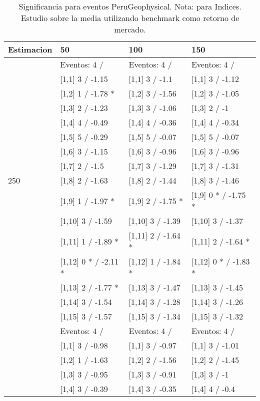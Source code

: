 \begin{table}

\caption{Significancia para eventos PeruGeophysical. Nota: para Indices. Estudio sobre la media utilizando benchmark como retorno de mercado.}
\centering
\begin{tabular}[t]{llll}
\toprule
Estimacion & 50 & 100 & 150\\
\midrule
 & Eventos:  4 / & Eventos:  4 / & Eventos:  4 /\\
 & {}[1,1] 3  / -1.15 & {}[1,1] 3  / -1.1 & {}[1,1] 3  / -1.12\\
 & {}[1,2] 1  / -1.78 * & {}[1,2] 3  / -1.56 & {}[1,2] 3  / -1.05\\
 & {}[1,3] 2  / -1.23 & {}[1,3] 3  / -1.06 & {}[1,3] 2  / -1\\
 & {}[1,4] 4  / -0.49 & {}[1,4] 4  / -0.36 & {}[1,4] 4  / -0.34\\
\addlinespace
 & {}[1,5] 5  / -0.29 & {}[1,5] 5  / -0.07 & {}[1,5] 5  / -0.07\\
 & {}[1,6] 3  / -1.15 & {}[1,6] 3  / -0.96 & {}[1,6] 3  / -0.96\\
 & {}[1,7] 2  / -1.5 & {}[1,7] 3  / -1.29 & {}[1,7] 3  / -1.31\\
250 & {}[1,8] 2  / -1.63 & {}[1,8] 2  / -1.44 & {}[1,8] 3  / -1.46\\
 & {}[1,9] 1  / -1.97 * & {}[1,9] 2  / -1.75 * & {}[1,9] 0 * / -1.75 *\\
\addlinespace
 & {}[1,10] 3  / -1.59 & {}[1,10] 3  / -1.39 & {}[1,10] 3  / -1.37\\
 & {}[1,11] 1  / -1.89 * & {}[1,11] 2  / -1.64 * & {}[1,11] 2  / -1.64 *\\
 & {}[1,12] 0 * / -2.11 * & {}[1,12] 1  / -1.84 * & {}[1,12] 0 * / -1.83 *\\
 & {}[1,13] 2  / -1.77 * & {}[1,13] 3  / -1.47 & {}[1,13] 3  / -1.45\\
 & {}[1,14] 3  / -1.54 & {}[1,14] 3  / -1.28 & {}[1,14] 3  / -1.26\\
\addlinespace
 & {}[1,15] 3  / -1.57 & {}[1,15] 3  / -1.34 & {}[1,15] 3  / -1.32\\
 & Eventos:  4 / & Eventos:  4 / & Eventos:  4 /\\
 & {}[1,1] 3  / -0.98 & {}[1,1] 3  / -0.97 & {}[1,1] 3  / -1.01\\
 & {}[1,2] 1  / -1.63 & {}[1,2] 2  / -1.56 & {}[1,2] 2  / -1.45\\
 & {}[1,3] 3  / -0.95 & {}[1,3] 3  / -0.91 & {}[1,3] 3  / -1\\
\addlinespace
 & {}[1,4] 3  / -0.39 & {}[1,4] 3  / -0.35 & {}[1,4] 4  / -0.4\\

\end{tabular}
\end{table}
